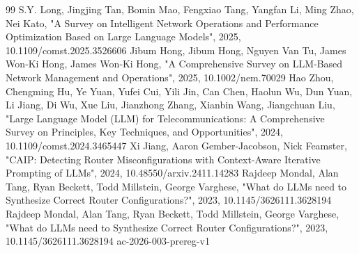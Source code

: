 \documentclass[conference]{IEEEtran}
\begin{document}
\begin{thebibliography}{99}
 S.Y. Long, Jingjing Tan, Bomin Mao, Fengxiao Tang, Yangfan Li, Ming Zhao, Nei Kato, "A Survey on Intelligent Network Operations and Performance Optimization Based on Large Language Models", 2025, 10.1109/comst.2025.3526606
 Jibum Hong, Jibum Hong, Nguyen Van Tu, James Won‐Ki Hong, James Won‐Ki Hong, "A Comprehensive Survey on LLM‐Based Network Management and Operations", 2025, 10.1002/nem.70029
 Hao Zhou, Chengming Hu, Ye Yuan, Yufei Cui, Yili Jin, Can Chen, Haolun Wu, Dun Yuan, Li Jiang, Di Wu, Xue Liu, Jianzhong Zhang, Xianbin Wang, Jiangchuan Liu, "Large Language Model (LLM) for Telecommunications: A Comprehensive Survey on Principles, Key Techniques, and Opportunities", 2024, 10.1109/comst.2024.3465447
 Xi Jiang, Aaron Gember-Jacobson, Nick Feamster, "CAIP: Detecting Router Misconfigurations with Context-Aware Iterative Prompting of LLMs", 2024, 10.48550/arxiv.2411.14283
 Rajdeep Mondal, Alan Tang, Ryan Beckett, Todd Millstein, George Varghese, "What do LLMs need to Synthesize Correct Router Configurations?", 2023, 10.1145/3626111.3628194
 Rajdeep Mondal, Alan Tang, Ryan Beckett, Todd Millstein, George Varghese, "What do LLMs need to Synthesize Correct Router Configurations?", 2023, 10.1145/3626111.3628194
 ac-2026-003-prereg-v1
\end{thebibliography}
\end{document}

